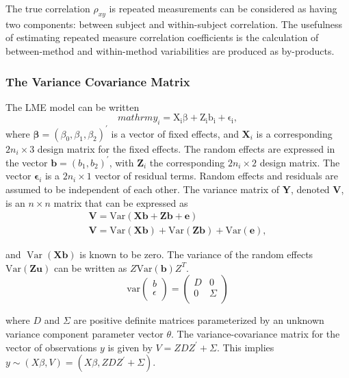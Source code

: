 \documentclass[12pt, a4paper]{report}
\theoremstyle{plain}
\theoremstyle{definition}
\theoremstyle{remark}
\begin{document}
	The true correlation $\rho_{xy}$ is repeated measurements can be considered as having two components: between subject and within-subject correlation. The usefulness of estimating repeated measure correlation coefficients is the calculation of between-method and within-method variabilities are produced as by-products.
	
\subsubsection{The Variance Covariance Matrix}
		The LME model can be written
		\[
		mathrm{y_{i}} = \mathrm{X_{i}\beta} + \mathrm{Z_{i}b_{i}} + \mathrm{\epsilon_{i}},
		\]
		where $\boldsymbol{\beta}=(\beta_0,\beta_1,\beta_2)^\prime$ is a vector of fixed effects, and $\boldsymbol{X}_i$ is a corresponding $2n_i\times 3$ design matrix for the fixed effects. The random effects are expressed in the vector $\boldsymbol{b}=(b_1,b_2)^\prime$, with $\boldsymbol{Z}_i$ the corresponding $2n_i\times 2$ design matrix. The vector $\boldsymbol{\epsilon}_i$ is a $2n_i\times 1$ vector of residual terms. Random effects and residuals are assumed to be independent of each other.
	The variance matrix of \textbf{Y}, denoted \textbf{V}, is an $n \times n$ matrix that can be expressed
	as 
	\begin{eqnarray}
	\textbf{V}= \textrm{Var} ( \textbf{Xb} + \textbf{Zb} + \textbf{e})\\
	\textbf{V}= \textrm{Var} ( \textbf{Xb} ) + \textrm{Var} (\textbf{Zb}) +
	\textrm{Var}(\textbf{e}),
	\end{eqnarray}
	
	
and $\operatorname{Var}(\textbf{Xb})$ is known to be zero. The variance of the
	random effects $\mbox{Var}(\textbf{Zu})$ can be written as
	$Z\mbox{Var}(\textbf{b})Z^{T}$.
	\[
	\mathrm{var}
	\left(
	\begin{array}{c}
	b \\
	\epsilon \\
	\end{array}
	\right)
	=
	\left(
	\begin{array}{cc}
	D & 0 \\
	0 & \Sigma \\
	\end{array}
	\right)
	\]
	
	
	
	
	where $D$ and $\Sigma$ are positive definite matrices parameterized by an unknown variance component parameter vector $ \theta.$ The variance-covariance matrix for the vector of observations $y$ is given by $V = ZDZ^{\prime}+ \Sigma.$ This implies $y \sim(X\beta, V) = (X\beta,ZDZ^{\prime}+ \Sigma)$. 
			
\end{document}
